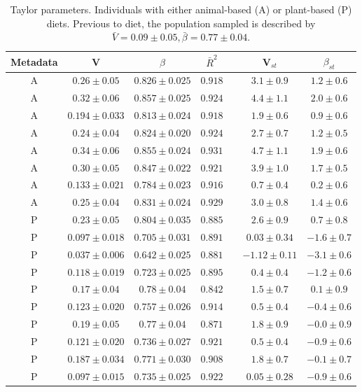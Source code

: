 \documentclass[12pt,oneside,letterpaper]{article}
\begin{document}
\begin{table} 
  \begin{center}
    \begin{tabular}{ccccccc}
	    \hline
		Metadata&V&$\beta$&$\bar{R}^2$&&V$_{st}$&$\beta_{st}$\\
		\hline
		A&$0.26 \pm 0.05$&$0.826 \pm 0.025$&$0.918$&&$3.1 \pm 0.9$&$1.2 \pm 0.6$\\
		A&$0.32 \pm 0.06$&$0.857 \pm 0.025$&$0.924$&&$4.4 \pm 1.1$&$2.0 \pm 0.6$\\
		A&$0.194 \pm 0.033$&$0.813 \pm 0.024$&$0.918$&&$1.9 \pm 0.6$&$0.9 \pm 0.6$\\
		A&$0.24 \pm 0.04$&$0.824 \pm 0.020$&$0.924$&&$2.7 \pm 0.7$&$1.2 \pm 0.5$\\
		A&$0.34 \pm 0.06$&$0.855 \pm 0.024$&$0.931$&&$4.7 \pm 1.1$&$1.9 \pm 0.6$\\
		A&$0.30 \pm 0.05$&$0.847 \pm 0.022$&$0.921$&&$3.9 \pm 1.0$&$1.7 \pm 0.5$\\
		A&$0.133 \pm 0.021$&$0.784 \pm 0.023$&$0.916$&&$0.7 \pm 0.4$&$0.2 \pm 0.6$\\
		A&$0.25 \pm 0.04$&$0.831 \pm 0.024$&$0.929$&&$3.0 \pm 0.8$&$1.4 \pm 0.6$\\
		\hline
		P&$0.23 \pm 0.05$&$0.804 \pm 0.035$&$0.885$&&$2.6 \pm 0.9$&$0.7 \pm 0.8$\\
		P&$0.097 \pm 0.018$&$0.705 \pm 0.031$&$0.891$&&$0.03 \pm 0.34$&$-1.6 \pm 0.7$\\
		P&$0.037 \pm 0.006$&$0.642 \pm 0.025$&$0.881$&&$-1.12 \pm 0.11$&$-3.1 \pm 0.6$\\
		P&$0.118 \pm 0.019$&$0.723 \pm 0.025$&$0.895$&&$0.4 \pm 0.4$&$-1.2 \pm 0.6$\\
		P&$0.17 \pm 0.04$&$0.78 \pm 0.04$&$0.842$&&$1.5 \pm 0.7$&$0.1 \pm 0.9$\\
		P&$0.123 \pm 0.020$&$0.757 \pm 0.026$&$0.914$&&$0.5 \pm 0.4$&$-0.4 \pm 0.6$\\
		P&$0.19 \pm 0.05$&$0.77 \pm 0.04$&$0.871$&&$1.8 \pm 0.9$&$-0.0 \pm 0.9$\\
		P&$0.121 \pm 0.020$&$0.736 \pm 0.027$&$0.921$&&$0.5 \pm 0.4$&$-0.9 \pm 0.6$\\
		P&$0.187 \pm 0.034$&$0.771 \pm 0.030$&$0.908$&&$1.8 \pm 0.7$&$-0.1 \pm 0.7$\\
		P&$0.097 \pm 0.015$&$0.735 \pm 0.025$&$0.922$&&$0.05 \pm 0.28$&$-0.9 \pm 0.6$\\
	   \hline
	   \hline
    \end{tabular}
  \end{center}
  \caption{Taylor parameters. Individuals with either animal-based (A) or plant-based (P) diets\cite{diet}. Previous to diet,  the population sampled is described by $\bar{V} = 0.09 \pm 0.05, \bar{\beta} = 0.77 \pm 0.04$.}
  \label{tab:diet}
\end{table}
\end{document}
